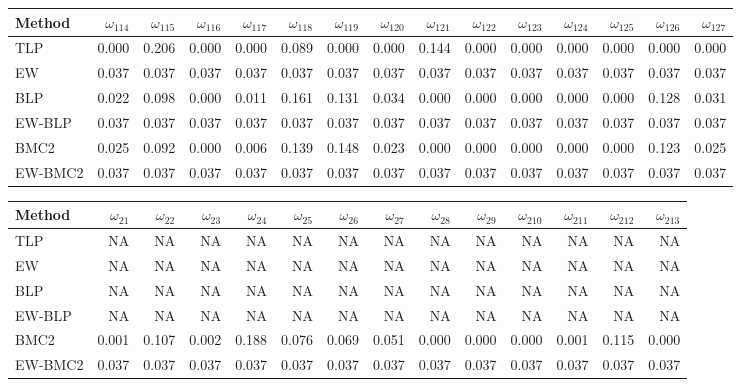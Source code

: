 \documentclass[
]{article}
\begin{document}
\begin{tabular}{lrrrrrrrrrrrrrr}
\toprule
Method & $\omega_{114}$ & $\omega_{115}$ & $\omega_{116}$ & $\omega_{117}$ & $\omega_{118}$ & $\omega_{119}$ & $\omega_{120}$ & $\omega_{121}$ & $\omega_{122}$ & $\omega_{123}$ & $\omega_{124}$ & $\omega_{125}$ & $\omega_{126}$ & $\omega_{127}$\\
\midrule
TLP & 0.000 & 0.206 & 0.000 & 0.000 & 0.089 & 0.000 & 0.000 & 0.144 & 0.000 & 0.000 & 0.000 & 0.000 & 0.000 & 0.000\\
EW & 0.037 & 0.037 & 0.037 & 0.037 & 0.037 & 0.037 & 0.037 & 0.037 & 0.037 & 0.037 & 0.037 & 0.037 & 0.037 & 0.037\\
BLP & 0.022 & 0.098 & 0.000 & 0.011 & 0.161 & 0.131 & 0.034 & 0.000 & 0.000 & 0.000 & 0.000 & 0.000 & 0.128 & 0.031\\
EW-BLP & 0.037 & 0.037 & 0.037 & 0.037 & 0.037 & 0.037 & 0.037 & 0.037 & 0.037 & 0.037 & 0.037 & 0.037 & 0.037 & 0.037\\
BMC2 & 0.025 & 0.092 & 0.000 & 0.006 & 0.139 & 0.148 & 0.023 & 0.000 & 0.000 & 0.000 & 0.000 & 0.000 & 0.123 & 0.025\\
EW-BMC2 & 0.037 & 0.037 & 0.037 & 0.037 & 0.037 & 0.037 & 0.037 & 0.037 & 0.037 & 0.037 & 0.037 & 0.037 & 0.037 & 0.037\\
\bottomrule
\end{tabular}

\begin{tabular}{lrrrrrrrrrrrrr}
\toprule
Method & $\omega_{21}$ & $\omega_{22}$ & $\omega_{23}$ & $\omega_{24}$ & $\omega_{25}$ & $\omega_{26}$ & $\omega_{27}$ & $\omega_{28}$ & $\omega_{29}$ & $\omega_{210}$ & $\omega_{211}$ & $\omega_{212}$ & $\omega_{213}$\\
\midrule
TLP & NA & NA & NA & NA & NA & NA & NA & NA & NA & NA & NA & NA & NA\\
EW & NA & NA & NA & NA & NA & NA & NA & NA & NA & NA & NA & NA & NA\\
BLP & NA & NA & NA & NA & NA & NA & NA & NA & NA & NA & NA & NA & NA\\
EW-BLP & NA & NA & NA & NA & NA & NA & NA & NA & NA & NA & NA & NA & NA\\
BMC2 & 0.001 & 0.107 & 0.002 & 0.188 & 0.076 & 0.069 & 0.051 & 0.000 & 0.000 & 0.000 & 0.001 & 0.115 & 0.000\\
EW-BMC2 & 0.037 & 0.037 & 0.037 & 0.037 & 0.037 & 0.037 & 0.037 & 0.037 & 0.037 & 0.037 & 0.037 & 0.037 & 0.037\\
\bottomrule
\end{tabular}
\end{document}
